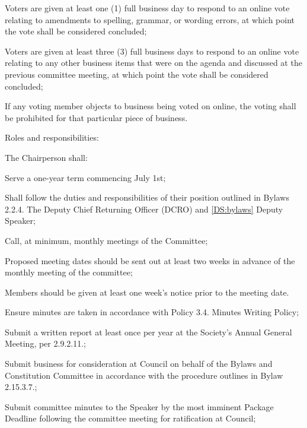 \begin{longenum}[ label*=\thesubsection.\arabic*., align=left]
\begin{longenum}[ label*=\arabic*., align=left]
		\begin{longenum}[ label*=\arabic*., align=left] 	
		\item Voters are given at least one (1) full business day to respond to an online vote relating to amendments to spelling, grammar, or wording errors, at which point the vote shall be considered concluded;
		\item Voters are given at least three (3) full business days to respond to an online vote relating to any other business items that were on the agenda and discussed at the previous committee meeting, at which point the vote shall be considered concluded;
		\item If any voting member objects to business being voted on online, the voting shall be prohibited for that particular piece of business.	
		\end{longenum}	
\item Roles and responsibilities:
	\begin{longenum}[ label*=\arabic*., align=left] 
	\item The Chairperson shall:
		\begin{longenum}[ label*=\arabic*., align=left] 
		\item Serve a one-year term commencing July 1st;
		\item Shall follow the duties and responsibilities of their position outlined in Bylaws 2.2.4. The Deputy Chief Returning Officer (DCRO) and \ref{DS:bylaws} Deputy Speaker;
		\item Call, at minimum, monthly meetings of the Committee;
			\begin{longenum}[ label*=\arabic*., align=left] 
			\item Proposed meeting dates should be sent out at least two weeks in advance of the monthly meeting of the committee;
			\item Members should be given at least one week's notice prior to the meeting date.
			\end{longenum}
		\item Ensure minutes are taken in accordance with Policy 3.4. Minutes Writing Policy;
		\item Submit a written report at least once per year at the Society's Annual General Meeting, per 2.9.2.11.;
		\item Submit business for consideration at Council on behalf of the Bylaws and Constitution Committee in accordance with the procedure outlines in Bylaw 2.15.3.7.;
		\item Submit committee minutes to the Speaker by the most imminent Package Deadline following the committee meeting for ratification at Council; 

\end{longenum}
\end{longenum}
\end{longenum}
\end{longenum}
